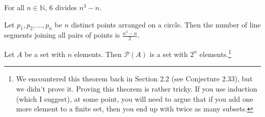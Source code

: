 \begin{problem}[*]
For all $n\in\mathbb{N}$, 6 divides $n^{3}-n$.
\end{problem}

\begin{problem}[*]
Let $p_{1}, p_{2}, \ldots, p_{n}$ be $n$ distinct points arranged on a circle.  Then the number of line segments joining all pairs of points is $\frac{n^{2}-n}{2}$.
\end{problem}

\begin{theorem}[*]
Let $A$ be a set with $n$ elements.  Then $\mathcal{P}(A)$ is a set with $2^{n}$ elements.\footnote{We encountered this theorem back in Section 2.2 (see Conjecture 2.33), but we didn't prove it.  Proving this theorem is rather tricky.  If you use induction (which I suggest), at some point, you will need to argue that if you add one more element to a finite set, then you end up with twice as many subsets.}
\end{theorem}
